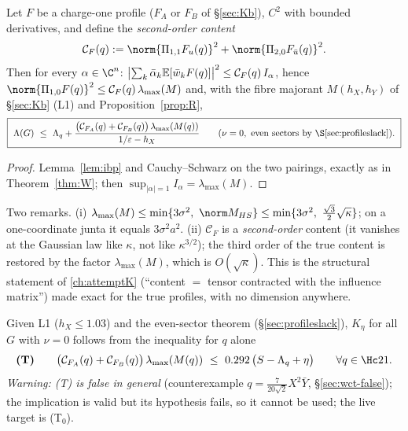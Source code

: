 \begin{theorem}\label{thm:R}
Let $F$ be a charge-one profile ($F_A$ or $F_B$ of \S\ref{sec:Kb}), $C^2$ with bounded derivatives, and define the \emph{second-order content}
\[
\mathcal C_F(q):=\norm{\Pi_{1,1}F_u(q)}^2+\norm{\Pi_{2,0}F_{\bar u}(q)}^2 .
\]
Then for every $\alpha\in\C^n$: $\bigl|\sum_k\bar\alpha_k\mathbb E[\bar w_kF(q)]\bigr|^2\le\mathcal C_F(q)\,I_\alpha$, hence $\norm{\Pi_{1,0}F(q)}^2\le\mathcal C_F(q)\,\lambda_{\max}(M)$ and, with the fibre
majorant $M(h_X,h_Y)$ of \S\ref{sec:Kb} (L1) and Proposition~\ref{prop:R},
\[
\boxed{\ \Lambda(G)\ \le\ \Lambda_q+\frac{\bigl(\mathcal C_{F_A}(q)+\mathcal C_{F_B}(q)\bigr)\,\lambda_{\max}(M(q))}{1/\varepsilon-h_X}\qquad(\nu=0,\ \text{even sectors by \S\ref{sec:profileslack}}).\ }
\]
\end{theorem}
\begin{proof}Lemma~\ref{lem:ibp} and Cauchy--Schwarz on the two pairings, exactly as in Theorem~\ref{thm:W}; then $\sup_{|\alpha|=1}I_\alpha=\lambda_{\max}(M)$.\end{proof}
Two remarks. (i) $\lambda_{\max}(M)\le\min\{3\sigma^2,\ \norm M_{HS}\}\le\min\{3\sigma^2,\ \tfrac{\sqrt3}2\sqrt\kappa\}$; on a one-coordinate junta it equals $3\sigma^2a^2$. (ii) $\mathcal C_F$ is a
\emph{second-order} content (it vanishes at the Gaussian law like $\kappa$, not like $\kappa^{3/2}$); the third order of the true content is restored by the factor $\lambda_{\max}(M)$, which is
$O(\sqrt\kappa)$. This is the structural statement of \autoref{ch:attemptK} (``content $=$ tensor contracted with the influence matrix'') made exact for the true profiles, with no dimension anywhere.

\begin{corollary}\label{cor:T}
Given L1 ($h_X\le1.03$) and the even-sector theorem (\S\ref{sec:profileslack}), $K_\eta$ for all $G$ with $\nu=0$ follows from the inequality for $q$ alone
\[
\textbf{(T)}\qquad \bigl(\mathcal C_{F_A}(q)+\mathcal C_{F_B}(q)\bigr)\,\lambda_{\max}(M(q))\ \le\ 0.292\,\bigl(S-\Lambda_q+\eta\bigr)\qquad\forall q\in\Hc21 .
\]
\emph{Warning: (T) is false in general} (counterexample $q=\frac7{20\sqrt2}X^2\bar Y$, \S\ref{sec:wct-false}); the implication is valid but its hypothesis fails, so it cannot be used; the live target is (T$_0$).
\end{corollary}

